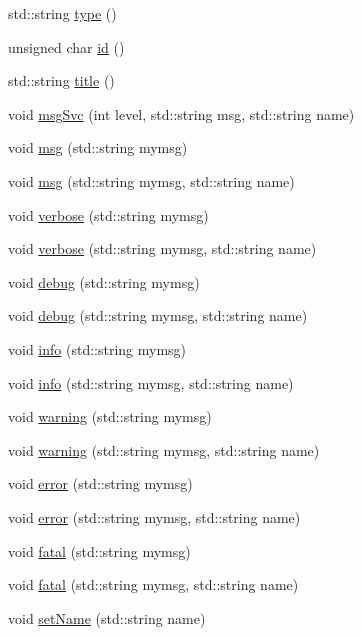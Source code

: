 \begin{DoxyCompactItemize}
std::string \hyperlink{classObject_a84f99f70f144a83e1582d1d0f84e4e62}{type} ()
\item 
unsigned char \hyperlink{classObject_af99145335cc61ff6e2798ea17db009d2}{id} ()
\item 
std::string \hyperlink{classObject_a73a0f1a41828fdd8303dd662446fb6c3}{title} ()
\item 
void \hyperlink{classObject_a3f9d5537ebce0c0f2bf6ae4d92426f3c}{msgSvc} (int level, std::string msg, std::string name)
\item 
void \hyperlink{classObject_a58b2d0618c2d08cf2383012611528d97}{msg} (std::string mymsg)
\item 
void \hyperlink{classObject_ac5d59299273cee27aacf7de00d2e7034}{msg} (std::string mymsg, std::string name)
\item 
void \hyperlink{classObject_a83d2db2df682907ea1115ad721c1c4a1}{verbose} (std::string mymsg)
\item 
void \hyperlink{classObject_a2d4120195317e2a3c6532e8bb9f3da68}{verbose} (std::string mymsg, std::string name)
\item 
void \hyperlink{classObject_aac010553f022165573714b7014a15f0d}{debug} (std::string mymsg)
\item 
void \hyperlink{classObject_a6c9a0397ca804e04d675ed05683f5420}{debug} (std::string mymsg, std::string name)
\item 
void \hyperlink{classObject_a644fd329ea4cb85f54fa6846484b84a8}{info} (std::string mymsg)
\item 
void \hyperlink{classObject_a1ca123253dfd30fc28b156f521dcbdae}{info} (std::string mymsg, std::string name)
\item 
void \hyperlink{classObject_a65cd4fda577711660821fd2cd5a3b4c9}{warning} (std::string mymsg)
\item 
void \hyperlink{classObject_a11f101db4dd73d9391b0231818881d86}{warning} (std::string mymsg, std::string name)
\item 
void \hyperlink{classObject_a204a95f57818c0f811933917a30eff45}{error} (std::string mymsg)
\item 
void \hyperlink{classObject_ad7f6c457733082efa2f9ff5f5c8e119a}{error} (std::string mymsg, std::string name)
\item 
void \hyperlink{classObject_aad5a16aac7516ce65bd5ec02ab07fc80}{fatal} (std::string mymsg)
\item 
void \hyperlink{classObject_ae62acd3d09f716220f75f252dc38bc9a}{fatal} (std::string mymsg, std::string name)
\item 
void \hyperlink{classObject_ae30fea75683c2d149b6b6d17c09ecd0c}{setName} (std::string name)

\end{DoxyCompactItemize}
